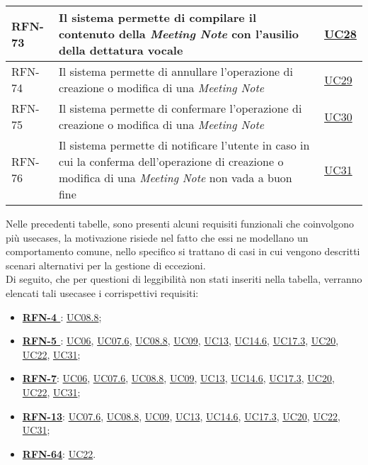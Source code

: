 \begin{table}
\begin{tabularx}{\textwidth}{lXl}
    \hline
    RFN-73 \label{RFN-73} & Il sistema permette di compilare il contenuto della \emph{Meeting Note} con l'ausilio della dettatura vocale & \hyperref[UC28]{UC28} \\
    \hline
    RFN-74 \label{RFN-74} & Il sistema permette di annullare l'operazione di creazione o modifica di una \emph{Meeting Note} & \hyperref[UC29]{UC29} \\
    \hline
    RFN-75 \label{RFN-75} & Il sistema permette di confermare l'operazione di creazione o modifica di una \emph{Meeting Note} & \hyperref[UC30]{UC30} \\
    \hline
    RFN-76 \label{RFN-76} & Il sistema permette di notificare l'utente in caso in cui la conferma dell'operazione di creazione o modifica di una \emph{Meeting Note} non vada a buon fine & \hyperref[UC31]{UC31} \\
    \hline
\end{tabularx}
\end{table}

\clearpage

\noindent Nelle precedenti tabelle, sono presenti alcuni requisiti funzionali che coinvolgono più \glspl{usecase}\glsoccur, la motivazione risiede nel fatto che essi ne modellano un comportamento comune, nello specifico si trattano di casi in cui vengono descritti scenari alternativi per la gestione di eccezioni.\\
Di seguito, che per questioni di leggibilità non stati inseriti nella tabella, verranno elencati tali \gls{usecase}\glsoccur e i corrispettivi requisiti:
\begin{itemize}
    \item \textbf{\hyperref[RFN-4]{RFN-4 }}: \hyperref[UC08.8]{UC08.8};
    \item \textbf{\hyperref[RFN-5]{RFN-5 }}: \hyperref[UC06]{UC06}, \hyperref[UC07.6]{UC07.6}, \hyperref[UC08.8]{UC08.8}, \hyperref[UC09]{UC09}, \hyperref[UC13]{UC13}, \hyperref[UC14.6]{UC14.6}, \hyperref[UC17.3]{UC17.3}, \hyperref[UC20]{UC20}, \hyperref[UC22]{UC22}, \hyperref[UC31]{UC31};
    \item \textbf{\hyperref[RFN-7]{RFN-7}}: \hyperref[UC06]{UC06}, \hyperref[UC07.6]{UC07.6}, \hyperref[UC08.8]{UC08.8}, \hyperref[UC09]{UC09}, \hyperref[UC13]{UC13}, \hyperref[UC14.6]{UC14.6}, \hyperref[UC17.3]{UC17.3}, \hyperref[UC20]{UC20}, \hyperref[UC22]{UC22}, \hyperref[UC31]{UC31};
    \item \textbf{\hyperref[RFN-13]{RFN-13}}: \hyperref[UC07.6]{UC07.6}, \hyperref[UC08.8]{UC08.8}, \hyperref[UC09]{UC09}, \hyperref[UC13]{UC13}, \hyperref[UC14.6]{UC14.6}, \hyperref[UC17.3]{UC17.3}, \hyperref[UC20]{UC20}, \hyperref[UC22]{UC22}, \hyperref[UC31]{UC31};
    \item \textbf{\hyperref[RFN-64]{RFN-64}}: \hyperref[UC22]{UC22}.
\end{itemize}

